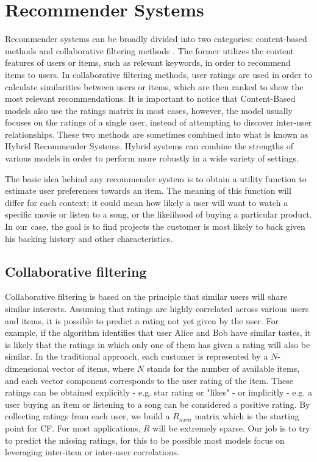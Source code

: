 \documentclass[cic,tc,english]{iiufrgs}
\begin{document}
\section{Recommender Systems}
Recommender systems can be broadly divided into two categories: content-based methods and collaborative filtering methods \cite{Rakesh2016}.
The former utilizes the content features of users or items, such as relevant keywords, in order to recommend items to users. In collaborative filtering methods, user ratings are used in order to calculate similarities between users or items, which are then ranked to show the most relevant recommendations. It is important to notice that Content-Based models also use the ratings matrix in most cases, however, the model usually focuses on the ratings of a single user, instead of attempting to discover inter-user relationships. These two methods are sometimes combined into what is known as Hybrid Recommender Systems. Hybrid systems can combine the strengths of various models in order to perform more robustly in a wide variety of settings.

The basic idea behind any recommender system is to obtain a utility function to estimate user preferences towards an item. The meaning of this function will differ for each context; it could mean how likely a user will want to watch a specific movie or listen to a song, or the likelihood of buying a particular product. In our case, the goal is to find projects the customer is most likely to back given his backing history and other characteristics. 


\subsection{Collaborative filtering}
Collaborative filtering is based on the principle that similar users will share similar interests. Assuming that ratings are highly correlated across various users and items, it is possible to predict a rating not yet given by the user. For example, if the algorithm identifies that user Alice and Bob have similar tastes, it is likely that the ratings in which only one of them has given a rating will also be similar. In the traditional approach, each customer is represented by a \(N\)-dimensional vector of items, where \(N\) stands for the number of available items, and each vector component corresponds to the user rating of the item. These ratings can be obtained explicitly - e.g. star rating or "likes" - or implicitly - e.g. a user buying an item or listening to a song can be considered a positive rating. By collecting ratings from each user, we build a \(R_{nxm}\) matrix which is the starting point for CF. For most applications, $R$ will be extremely sparse. Our job is to try to predict the missing ratings, for this to be possible most models focus on leveraging inter-item or inter-user correlations.
\end{document}
